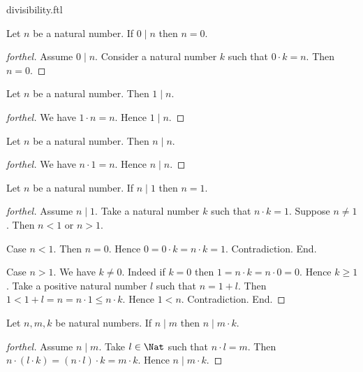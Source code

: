\documentclass{naproche-library}
\begin{document}
\begin{smodule}[title=Divisibility]{divisibility.ftl}
\begin{proposition}[forthel,id=ARITHMETIC_07_8611150130315264]
  Let $n$ be a natural number.
  If $0 \mid n$ then $n = 0$.
\end{proposition}
\begin{proof}[forthel]
  Assume $0 \mid n$.
  Consider a natural number $k$ such that $0 \cdot k = n$.
  Then $n = 0$.
\end{proof}

\begin{proposition}[forthel,id=ARITHMETIC_07_1259086070939648]
  Let $n$ be a natural number.
  Then $1 \mid n$.
\end{proposition}
\begin{proof}[forthel]
  We have $1 \cdot n = n$.
  Hence $1 \mid n$.
\end{proof}

\begin{proposition}[forthel,id=ARITHMETIC_07_3944887330275328]
  Let $n$ be a natural number.
  Then $n \mid n$.
\end{proposition}
\begin{proof}[forthel]
  We have $n \cdot 1 = n$.
  Hence $n \mid n$.
\end{proof}

\begin{proposition}[forthel,id=ARITHMETIC_07_6917446193643520]
  Let $n$ be a natural number.
  If $n \mid 1$ then $n = 1$.
\end{proposition}
\begin{proof}[forthel]
  Assume $n \mid 1$.
  Take a natural number $k$ such that $n \cdot k = 1$.
  Suppose $n \neq 1$.
  Then $n < 1$ or $n > 1$.

  Case $n < 1$.
    Then $n = 0$.
    Hence $0
      = 0 \cdot k
      = n \cdot k
      = 1$.
    Contradiction.
  End.

  Case $n > 1$.
    We have $k \neq 0$.
    Indeed if $k = 0$ then
    $1
      = n \cdot k
      = n \cdot 0
      = 0$.
    Hence $k \geq 1$.
    Take a positive natural number $l$ such that $n = 1 + l$.
    Then $1
      < 1 + l
      = n
      = n \cdot 1
      \leq n \cdot k$.
    Hence $1 < n$.
    Contradiction.
  End.
\end{proof}

\begin{proposition}[forthel,id=ARITHMETIC_07_7463519983239168]
  Let $n, m, k$ be natural numbers.
  If $n \mid m$ then $n \mid m \cdot k$.
\end{proposition}
\begin{proof}[forthel]
  Assume $n \mid m$.
  Take $l \in \Nat$ such that $n \cdot l = m$.
  Then $n \cdot (l \cdot k)
    = (n \cdot l) \cdot k
    = m \cdot k$.
  Hence $n \mid m \cdot k$.
\end{proof}


\end{smodule}
\end{document}
